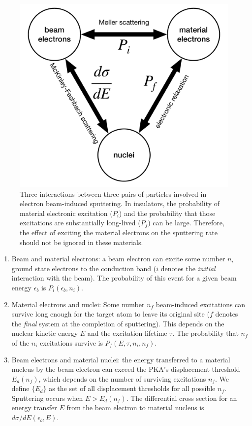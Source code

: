 \documentclass{article}
\begin{document}
\begin{figure}
  \centering
  \includegraphics[width=.7\textwidth]{fig1.pdf}
  \caption{
    Three interactions between three pairs of particles involved in electron
    beam-induced sputtering.
    In insulators, the probability of material electronic excitation ($P_i$)
    and the probability that those excitations are substantially long-lived
    ($P_f$) can be large.
    Therefore, the effect of exciting the material electrons on the sputtering
    rate should not be ignored in these materials.
  }
  \label{fig:triad}
\end{figure}

\begin{enumerate}
  \item Beam and material electrons:
    a beam electron can excite some number $n_i$ ground state electrons to the
    conduction band ($i$ denotes the \textit{initial} interaction with the
    beam).
    The probability of this event for a given beam energy $\epsilon_b$ is
    $P_i(\epsilon_b, n_i)$.
  \item Material electrons and nuclei:
    Some number $n_f$ beam-induced excitations can survive long enough for the
    target atom to leave its original site ($f$ denotes the \textit{final}
    system at the completion of sputtering).
    This depends on the nuclear kinetic energy $E$ and the excitation lifetime
    $\tau$.
    The probability that $n_f$ of the $n_i$ excitations survive is $P_f(E,
    \tau, n_i, n_f)$.
  \item Beam electrons and material nuclei: the energy transferred to a
    material nucleus by the beam electron can exceed the PKA's displacement
    threshold $E_d(n_f)$, which depends on the number of surviving excitations
    $n_f$.  We define $\{{E}_d\}$ as the set of all displacement thresholds for
    all possible $n_f$.  Sputtering occurs when $E>E_d(n_f)$.  The differential
    cross section for an energy transfer $E$ from the beam electron to
    material nucleus is $d\sigma/dE(\epsilon_b, E)$.
\end{enumerate}
\end{document}

